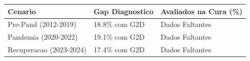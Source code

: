 \begin{tabular}{lll}
\toprule
Cenario & Gap Diagnostico & Avaliados na Cura (\%) \\
\midrule
Pre-Pand (2012-2019) & 18.8\% com G2D & Dados Faltantes \\
Pandemia (2020-2022) & 19.1\% com G2D & Dados Faltantes \\
Recuperacao (2023-2024) & 17.4\% com G2D & Dados Faltantes \\
\bottomrule
\end{tabular}
